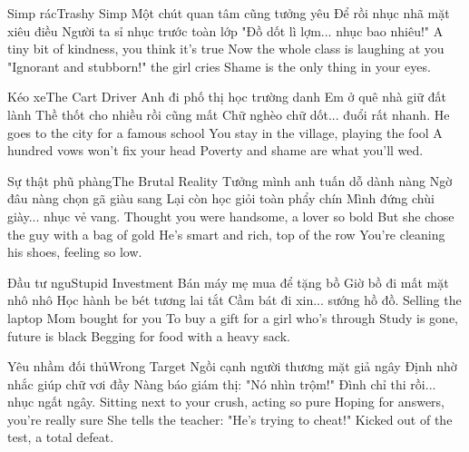 \begin{tutuyetbox}{Simp rác}{Trashy Simp}
Một chút quan tâm cũng tưởng yêu
Để rồi nhục nhã mặt xiêu điều
Người ta sỉ nhục trước toàn lớp
"Đồ dốt lì lợm... nhục bao nhiêu!"
\tcblower
A tiny bit of kindness, you think it's true
Now the whole class is laughing at you
"Ignorant and stubborn!" the girl cries
Shame is the only thing in your eyes.
\end{tutuyetbox}

\begin{tutuyetbox}{Kéo xe}{The Cart Driver}
Anh đi phố thị học trường danh
Em ở quê nhà giữ đất lành
Thề thốt cho nhiều rồi cũng mất
Chữ nghèo chữ dốt... đuổi rất nhanh.
\tcblower
He goes to the city for a famous school
You stay in the village, playing the fool
A hundred vows won't fix your head
Poverty and shame are what you'll wed.
\end{tutuyetbox}

\begin{tutuyetbox}{Sự thật phũ phàng}{The Brutal Reality}
Tưởng mình anh tuấn dỗ dành nàng
Ngờ đâu nàng chọn gã giàu sang
Lại còn học giỏi toàn phẩy chín
Mình đứng chùi giày... nhục vẻ vang.
\tcblower
Thought you were handsome, a lover so bold
But she chose the guy with a bag of gold
He's smart and rich, top of the row
You're cleaning his shoes, feeling so low.
\end{tutuyetbox}

\begin{tutuyetbox}{Đầu tư ngu}{Stupid Investment}
Bán máy mẹ mua để tặng bồ
Giờ bồ đi mất mặt nhô nhô
Học hành be bét tương lai tắt
Cầm bát đi xin... sướng hồ đồ.
\tcblower
Selling the laptop Mom bought for you
To buy a gift for a girl who's through
Study is gone, future is black
Begging for food with a heavy sack.
\end{tutuyetbox}

\begin{tutuyetbox}{Yêu nhầm đối thủ}{Wrong Target}
Ngồi cạnh người thương mặt giả ngây
Định nhờ nhắc giúp chữ vơi đầy
Nàng báo giám thị: "Nó nhìn trộm!"
Đình chỉ thi rồi... nhục ngất ngây.
\tcblower
Sitting next to your crush, acting so pure
Hoping for answers, you're really sure
She tells the teacher: "He's trying to cheat!"
Kicked out of the test, a total defeat.
\end{tutuyetbox}

